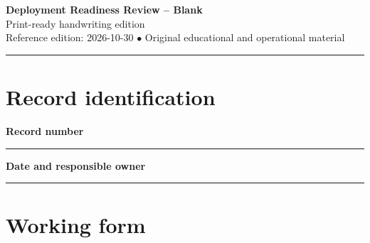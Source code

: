 \documentclass[10pt,letterpaper]{article}
\begin{document}
\begin{center}
{\LARGE\bfseries\color{cdblue}Deployment Readiness Review -- Blank}\\[7pt]
{\large Print-ready handwriting edition}\\[6pt]
{\small Reference edition: 2026-10-30 $\bullet$ Original educational and operational material}
\end{center}
\noindent\color{cdblue}\rule{\linewidth}{1.2pt}\color{black}
\vspace{0.4em}
\section{Record identification}
\textbf{Record number}\par
\noindent\rule{\linewidth}{0.35pt}\par\vspace{0.7em}
\textbf{Date and responsible owner}\par
\noindent\rule{\linewidth}{0.35pt}\par\vspace{0.7em}

\section{Working form}
\end{document}
